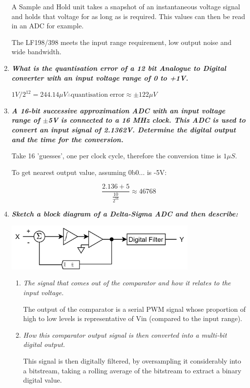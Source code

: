 \documentclass[11pt]{article}
\begin{document}
\begin{enumerate}
              A Sample and Hold unit takes a snapshot of an instantaneous voltage signal and holds that voltage for as long as is required. This values can then be read in an ADC for example.

              The LF198/398 meets the input range requirement, low output noise and wide bandwidth.

        \item \textit{\textbf{What is the quantisation error of a 12 bit Analogue to Digital converter with an input voltage range of 0 to +1V.}}

              $1V/2^{12}=244.14 \mu V \therefore \mathrm{quantisation \; error} \approx \pm 122 \mu V$

              \newpage
        \item \textit{\textbf{A 16-bit successive approximation ADC with an input voltage range of $\pm$5V is connected to a 16 MHz clock. This ADC is used to convert an input signal of 2.1362V. Determine the digital output and the time for the conversion.}}

              Take 16 'guesses', one per clock cycle, therefore the conversion time is $1\mu S$.

              To get nearest output value, assuming 0b0... is -5V:

              $$\frac{2.136+5}{\frac{10}{2^{16}}} \approx 46768$$

        \item \textit{\textbf{Sketch a block diagram of a Delta-Sigma ADC and then describe:}}

              \begin{center}
                  \includegraphics[width=0.75\textwidth]{inc/del-sig.png}
              \end{center}

              \begin{enumerate}
                  \item \textit{The signal that comes out of the comparator and how it relates to the input voltage.}

                        The output of the comparator is a serial PWM signal whose proportion of high to low levels is representative of Vin (compared to the input range).

                  \item \textit{How this comparator output signal is then converted into a multi-bit digital output.}

                        This signal is then digitally filtered, by oversampling it considerably into a bitstream, taking a rolling average of the bitstream to extract a binary digital value.

              \end{enumerate}
    \end{enumerate}
\end{document}
